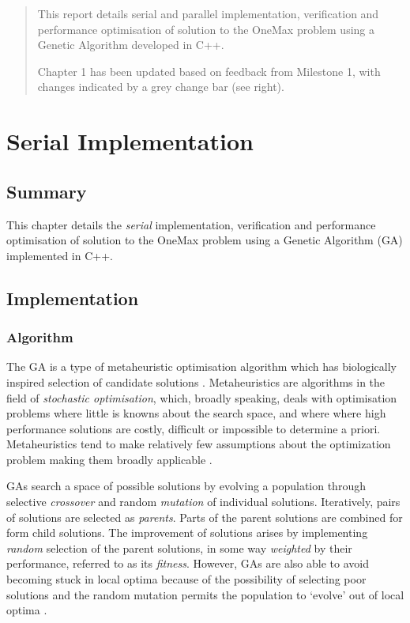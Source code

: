 \documentclass{report}
\begin{document}

\begin{abstract}

This \cbstart report details serial and parallel implementation, verification and performance optimisation of solution to the OneMax problem using a Genetic Algorithm developed in C++. 

Chapter 1 has been updated based on feedback from Milestone 1, with changes indicated by a grey change bar (see right).
\cbend
\end{abstract}
\chapter{Serial Implementation}
\section{Summary}
This \cbstart  chapter details the \emph{serial} implementation, verification and performance optimisation of solution to the OneMax problem using a Genetic Algorithm (GA) implemented in C++. \cbend

\section{Implementation} 
\subsection{Algorithm} 
The GA is a type of metaheuristic optimisation algorithm which has biologically inspired \cbstart selection of candidate solutions \cite{Luke2013Metaheuristics}. Metaheuristics are algorithms in the field of \emph{stochastic optimisation}, which, broadly speaking, deals with optimisation problems where little is knowns about the search space, and where where high performance solutions are costly, difficult or impossible to determine a priori. Metaheuristics tend to make relatively few assumptions about the optimization problem making them broadly applicable \cite{blum2003metaheuristics}. 

GAs search a space of possible solutions by evolving a population through selective \emph{crossover} and random \emph{mutation} of individual solutions. Iteratively, pairs of solutions are selected as \emph{parents}. Parts of the parent solutions are combined for form child solutions. The improvement of solutions arises by implementing \emph{random} selection of the parent solutions, in some way \emph{weighted} by their  performance, referred to as its \emph{fitness}. However, GAs are also able to avoid becoming stuck in local optima because of the possibility of selecting poor solutions and the random mutation permits the population to `evolve' out of local optima \cite{mirjalili2019genetic}. 
\end{document}
